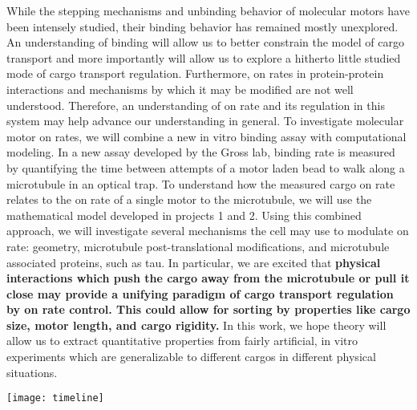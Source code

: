 {While the stepping mechanisms and unbinding behavior of molecular motors have been intensely studied, their binding behavior has remained mostly unexplored. An understanding of binding will allow us to better constrain the model of cargo transport and more importantly will allow us to explore a hitherto little studied mode of cargo transport regulation. Furthermore, on rates in protein-protein interactions and mechanisms by which it may be modified are not well understood. Therefore, an understanding of on rate and its regulation in this system may help advance our understanding in general. To investigate molecular motor on rates, we will combine a new in vitro binding assay with computational modeling. In a new assay developed by the Gross lab, binding rate is measured by quantifying the time between attempts of a motor laden bead to walk along a microtubule in an optical trap. To understand how the measured cargo on rate relates to the on rate of a single motor to the microtubule, we will use the mathematical model developed in projects 1 and 2. Using this combined approach, we will investigate several mechanisms the cell may use to modulate on rate: geometry, microtubule post-translational modifications, and microtubule associated proteins, such as tau. In particular, we are excited that \textbf{physical interactions which push the cargo away from the microtubule or pull it close may provide a unifying paradigm of cargo transport regulation by on rate control. This could allow for sorting by properties like cargo size, motor length, and cargo rigidity.} In this work, we hope theory will allow us to extract quantitative properties from fairly artificial, in vitro experiments which are generalizable to different cargos in different physical situations. 
}

\timelineofcompletion
{
 \begin{center}
 \texttt{[image: timeline]}
 \end{center}
}


